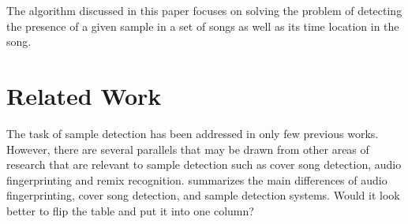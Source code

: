 \documentclass{article}
\begin{document}
The algorithm discussed in this paper focuses on solving the problem of detecting the presence of a given sample in a set of songs as well as its time location in the song.

%
\section{Related Work}
\label{related}
The task of sample detection has been addressed in only few previous works. However, there are several parallels that may be drawn from other areas of research that are relevant to sample detection such as cover song detection, audio fingerprinting and remix recognition.  summarizes the main differences of audio fingerprinting, cover song detection, and sample detection systems. {\color{red}Would it look better to flip the table and put it into one column?}
\end{document}
